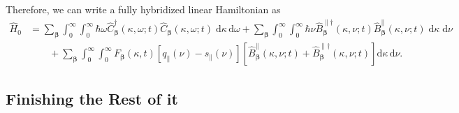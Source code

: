 \documentclass{article}
\begin{document}
Therefore, we can write a fully hybridized linear Hamiltonian as
\begin{equation}
\begin{split}
\hat{H}_0 &= \sum_{\bm{\beta}}\int_0^\infty\int_0^\infty\hbar\omega\hat{C}_{\bm{\beta}}^\dagger(\kappa,\omega;t)\hat{C}_{\bm{\beta}}(\kappa,\omega;t)\;\mathrm{d}\kappa\,\mathrm{d}\omega + \sum_{\bm{\beta}}\int_0^\infty\int_0^\infty\hbar\nu\hat{B}_{\bm{\beta}}^{\parallel\dagger}(\kappa,\nu;t)\hat{B}_{\bm{\beta}}^\parallel(\kappa,\nu;t)\;\mathrm{d}\kappa\;\mathrm{d}\nu\\
&\qquad + \sum_{\bm{\beta}}\int_0^\infty\int_0^\infty F_{\bm{\beta}}(\kappa,t)\left[q_\parallel(\nu) - s_\parallel(\nu)\right]\left[\hat{B}_{\bm{\beta}}^\parallel(\kappa,\nu;t) + \hat{B}_{\bm{\beta}}^{\parallel\dagger}(\kappa,\nu;t)\right]\mathrm{d}\kappa\,\mathrm{d}\nu.
\end{split}
\end{equation}













\subsection{Finishing the Rest of it}
\end{document}
